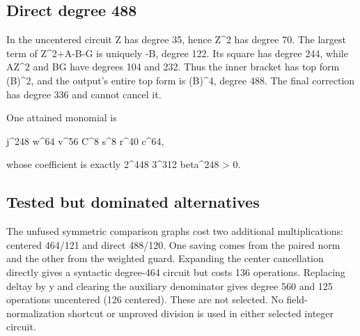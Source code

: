 \subsection*{Direct degree 488}



In the uncentered circuit Z has degree 35, hence Z\textasciicircum{}\allowbreak{}2 has degree 70. The largest term of Z\textasciicircum{}\allowbreak{}2+\allowbreak{}A-B-G is uniquely -B\textasteriskcentered{}\allowbreak{}, degree 122. Its square has degree 244, while AZ\textasciicircum{}\allowbreak{}2 and BG have degrees 104 and 232. Thus the inner bracket has top form (B\textasteriskcentered{}\allowbreak{})\textasciicircum{}\allowbreak{}2, and the output's entire top form is (B\textasteriskcentered{}\allowbreak{})\textasciicircum{}\allowbreak{}4, degree 488. The final correction has degree 336 and cannot cancel it.



One attained monomial is



j\textasciicircum{}\allowbreak{}248 w\textasciicircum{}\allowbreak{}64 v\textasciicircum{}\allowbreak{}56 C\textasciicircum{}\allowbreak{}8 s\textasciicircum{}\allowbreak{}8 r\textasciicircum{}\allowbreak{}40 c\textasciicircum{}\allowbreak{}64,



whose coefficient is exactly 2\textasciicircum{}\allowbreak{}448 3\textasciicircum{}\allowbreak{}312 beta\textasciicircum{}\allowbreak{}248 \textgreater{}\allowbreak{} 0.



\subsection*{Tested but dominated alternatives}



The unfused symmetric comparison graphs cost two additional multiplications: centered 464/\allowbreak{}121 and direct 488/\allowbreak{}120. One saving comes from the paired norm and the other from the weighted guard. Expanding the center cancellation directly gives a syntactic degree-464 circuit but costs 136 operations. Replacing delta\textasteriskcentered{}\allowbreak{}y by y and clearing the auxiliary denominator gives degree 560 and 125 operations uncentered (126 centered). These are not selected. No field-normalization shortcut or unproved division is used in either selected integer circuit.
